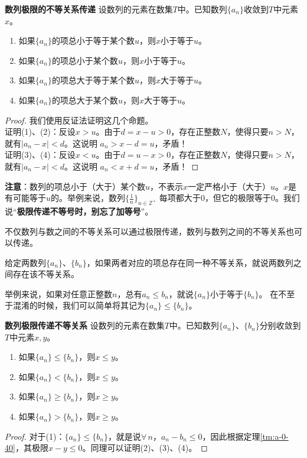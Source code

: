 \documentclass[12pt,UTF8,fontset=none]{ctexbook}
\begin{document}
\begin{appendix}
\begin{tm}{\textbf{数列极限的不等关系传递}}\label{tm:a-0-40}
    设数列的元素在数集$T$中。已知数列$\{a_n\}$收敛到$T$中元素$x$。
    \begin{enumerate}
        \item 如果$\{a_n\}$的项总小于等于某个数$u$，则$x$小于等于$u$。
        \item 如果$\{a_n\}$的项总小于某个数$u$，则$x$小于等于$u$。
        \item 如果$\{a_n\}$的项总大于等于某个数$u$，则$x$大于等于$u$。
        \item 如果$\{a_n\}$的项总大于某个数$u$，则$x$大于等于$u$。
    \end{enumerate}
\end{tm}
\begin{proof}
    我们使用反证法证明这几个命题。\\
    证明(1)、(2)：反设$x > u$。由于$d = x - u > 0$，存在正整数$N$，使得只要$n>N$，就有$|a_n - x| < d$。这说明
    $a_n > x - d = u$，矛盾！\\
    证明(3)、(4)：反设$x < u$。由于$d = u - x > 0$，存在正整数$N$，使得只要$n>N$，就有$|a_n - x| < d$。这说明
    $a_n < x + d = u$，矛盾！
\end{proof}

\textbf{注意}：数列的项总小于（大于）某个数$u$，不表示$x$一定严格小于（大于）$u$。$x$是有可能等于$u$的。举例来说，数列$\{\frac{1}{n}\}_{n\in\mathbb{Z}^+}$
每项都大于$0$，但它的极限等于$0$。我们说“\textbf{极限传递不等号时，别忘了加等号}”。

不仅数列与数之间的不等关系可以通过极限传递，数列与数列之间的不等关系也可以传递。

\begin{df}
    给定两数列$\{a_n\}$、$\{b_n\}$，如果两者对应的项总存在同一种不等关系，就说两数列之间存在该不等关系。
\end{df}
举例来说，如果对任意正整数$n$，总有$a_n \leqslant b_n$，就说$\{a_n\}$小于等于$\{b_n\}$。
在不至于混淆的时候，我们可以简单将其记为$\{a_n\} \leqslant \{b_n\}$。

\begin{tm}{\textbf{数列极限传递不等关系}}\label{tm:a-0-45}
    设数列的元素在数集$T$中。已知数列$\{a_n\}$、$\{b_n\}$分别收敛到$T$中元素$x,y$。
    \begin{enumerate}
        \item 如果$\{a_n\} \leqslant \{b_n\}$，则$x\leqslant y$。
        \item 如果$\{a_n\} < \{b_n\}$，则$x\leqslant y$。
        \item 如果$\{a_n\} \geqslant \{b_n\}$，则$x\geqslant y$。
        \item 如果$\{a_n\} > \{b_n\}$，则$x\geqslant y$。
    \end{enumerate}
\end{tm}
\begin{proof}
    对于(1)：$\{a_n\} \leqslant \{b_n\}$，就是说$\forall\,n$，$a_n - b_n \leqslant 0$，因此根据定理\ref{tm:a-0-40}，其极限$x - y\leqslant 0$。同理可以证明(2)、(3)、(4)。
\end{proof}


\end{appendix}
\end{document}
